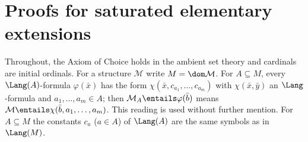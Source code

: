 \section{Proofs for saturated elementary extensions}
\label{sec:annex-p03-w03-p03-010-saturated-extension}

Throughout, the Axiom of Choice holds in the ambient set theory and
cardinals are initial ordinals.  For a structure \(\mathcal M\) write
\(M=\dom\mathcal M\).  For \(A\subseteq M\), every \(\Lang(A)\)-formula
\(\varphi(\bar x)\) has the form
\(\chi(\bar x,c_{a_1},\ldots,c_{a_m})\) with \(\chi(\bar x,\bar y)\) an
\(\Lang\)-formula and \(a_1,\ldots,a_m\in A\); then
\(\mathcal M_A\entails\varphi(\bar b)\) means
\(\mathcal M\entails\chi(\bar b,a_1,\ldots,a_m)\).  This reading is used
without further mention.  For \(A\subseteq M\) the constants \(c_a\)
(\(a\in A\)) of \(\Lang(A)\) are the same symbols as in \(\Lang(M)\).

